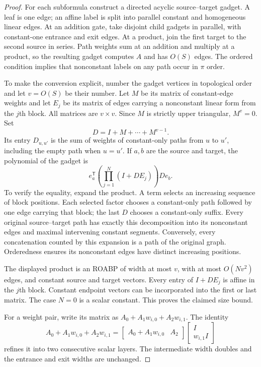 \documentclass[11pt]{article}
\theoremstyle{definition}
\theoremstyle{remark}
\begin{document}
\begin{proof}
For each subformula construct a directed acyclic source--target
gadget. A leaf is one edge; an affine label is split into parallel
constant and homogeneous linear edges. At an addition gate, take disjoint child
gadgets in parallel, with constant-one entrance and exit edges. At a
product, join the first target to the second source in series. Path
weights sum at an addition and multiply at a product, so the resulting
gadget computes $A$ and has $O(S)$ edges. The ordered condition implies
that nonconstant labels on any path occur in $\pi$ order.

To make the conversion explicit, number the gadget vertices
in topological order and let $v=O(S)$ be their number. Let $M$ be
its matrix of constant-edge weights and let $E_j$ be its matrix of
edges carrying a nonconstant linear form from the $j$th block.
All matrices are $v\times v$.
Since $M$ is strictly upper triangular, $M^v=0$. Set
\[
 D=I+M+\cdots+M^{v-1}.
\]
Its entry $D_{u,u'}$ is the sum of weights of constant-only paths from
$u$ to $u'$, including the empty path when $u=u'$. If $a,b$ are the
source and target, the polynomial of the gadget is
\[
 e_a^{\mathsf T}\left(\prod_{j=1}^{N}(I+D E_j)\right)D e_b.
\]
To verify the equality, expand the product. A term selects an increasing
sequence of block positions. Each selected factor chooses a
constant-only path followed by one edge carrying that block; the
last $D$ chooses a constant-only suffix. Every original source--target
path has exactly this decomposition into its nonconstant edges and
maximal intervening constant segments. Conversely, every concatenation
counted by this expansion is a path of the original graph. Orderedness
ensures its nonconstant edges have distinct increasing positions.

The displayed product is an ROABP of width at most $v$, with at most
$O(Nv^2)$ edges, and constant source and target vectors. Every entry
of $I+D E_j$ is affine in the $j$th block. Constant endpoint vectors
can be incorporated into the first or last matrix. The case $N=0$
is a scalar constant. This proves the claimed size bound.

For a weight pair, write its matrix as
$A_0+A_1w_{i,0}+A_2w_{i,1}$. The identity
\[
 A_0+A_1w_{i,0}+A_2w_{i,1}
 =\begin{bmatrix}A_0+A_1w_{i,0}&A_2\end{bmatrix}
  \begin{bmatrix}I\\w_{i,1}I\end{bmatrix}
\]
refines it into two consecutive scalar layers. The intermediate width
doubles and the entrance and exit widths are unchanged.
\end{proof}
\end{document}
